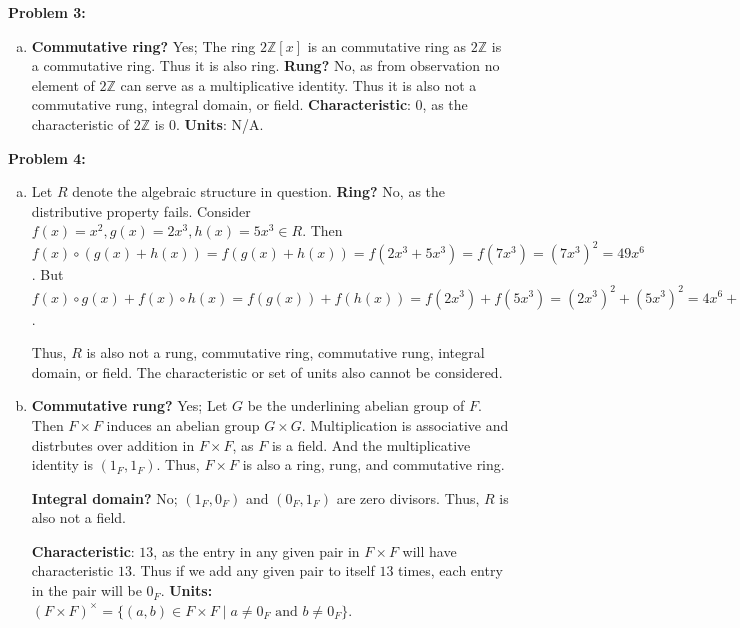 \documentclass[12pt, letterpaper]{article}
\newenvironment{problem}
    [1]
    {\noindent \textbf{Problem #1:}}
    {\vspace{3mm}}
\begin{document}
\begin{problem}{3}
\begin{enumerate}[(a)]
        \item \textbf{Commutative ring?} Yes; The ring $2\mathbb{Z}[x]$ is an commutative ring as $2\mathbb{Z}$ 
        is a commutative ring. Thus it is also ring. \textbf{Rung?} No, as from observation no element of $2\mathbb{Z}$ 
        can serve as a multiplicative identity. Thus it is also not a commutative rung, integral domain, or field.
        \textbf{Characteristic}: $0$, as the characteristic of $2\mathbb{Z}$ is $0$. \textbf{Units}: N/A.

    \end{enumerate}
\end{problem}

\begin{problem}{4}
    \begin{enumerate}[(a)]
        \item Let $R$ denote the algebraic structure in question. \textbf{Ring?} No, as the
        distributive property fails. Consider $f(x) = x^2, g(x) = 2x^3, h(x) = 5x^3 \in R$.
        Then $f(x) \circ (g(x) + h(x)) = f(g(x) + h(x)) = f(2x^3 + 5x^3) = f(7x^3) = 
        (7x^3)^2 = 49x^6$. But $f(x) \circ g(x) + f(x) \circ h(x) = f(g(x)) + f(h(x)) = 
        f(2x^3) + f(5x^3) = (2x^3)^2 + (5x^3)^2 = 4x^6 + 25x^6 = 29x^6$.

        \bigskip\noindent
        Thus, $R$ is also not a rung, commutative ring, commutative rung, integral domain, or
        field. The characteristic or set of units also cannot be considered.

        \item  
        \textbf{Commutative rung?} Yes; Let $G$ be the underlining abelian group of $F$. Then $F 
        \times F$ induces an abelian group $G \times G$. Multiplication is associative and distrbutes 
        over addition in $F \times F$, as $F$ is a field. And the multiplicative identity is $(1_F, 1_F)$.
        Thus, $F \times F$ is also a ring, rung, and commutative ring.

        \bigskip\noindent
        \textbf{Integral domain?} No; $(1_F, 0_F)$ and $(0_F, 1_F)$ are zero divisors. Thus, $R$ is also
        not a field.

        \bigskip\noindent
        \textbf{Characteristic}: $13$, as the entry in any given pair in $F \times F$ will have characteristic
        $13$. Thus if we add any given pair to itself $13$ times, each entry in the pair will be $0_F$. 
        \textbf{Units:} $(F \times F)^{\times} = \{(a, b) \in F \times F \;|\; a \neq 0_F \text{ and } b \neq 0_F\}$.
        

\end{enumerate}
\end{problem}
\end{document}
